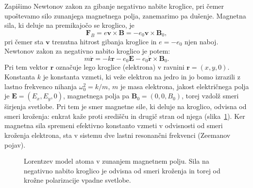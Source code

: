Zapišimo Newtonov zakon za gibanje negativno nabite kroglice,
pri čemer upoštevamo silo zunanjega magnetnega polja, zanemarimo pa dušenje. 
Magnetna sila, ki deluje na premikajočo se kroglico, je 
\begin{equation}
\mathbf{F}_B = e \mathbf{v}\times \mathbf{B} = -e_0 \mathbf{v}\times \mathbf{B}_0,
\label{eq:09_52}
\end{equation}
pri čemer sta $\mathbf{v}$ trenutna hitrost gibanja kroglice in $e = -e_0$
njen naboj. Newtonov zakon za negativno nabito kroglico je potem:
\begin{equation}
m\ddot{\mathbf{r}} = -k \mathbf{r}-e_0 \mathbf{E} -e_0 \dot{\mathbf{r}}\times \mathbf{B}_0.
\label{eq:09_55}
\end{equation}
Pri tem vektor $\mathbf{r}$ označuje lego kroglice (elektrona) v ravnini $\mathbf{r} = (x,y,0)$. Konstanta
$k$ je konstanta vzmeti, ki veže elektron na jedro in  jo bomo izrazili z lastno frekvenco 
nihanja $\omega_0^2 = k/m$, $m$ je masa elektrona, jakost električnega polja je $\mathbf{E} = (E_x, E_y, 0)$,
magnetnega polja pa $\mathbf{B}_0 = (0,0,B_0)$, torej vzdolž smeri širjenja svetlobe. 
Pri tem je smer magnetne sile, ki deluje na kroglico, odvisna od smeri kroženja: 
enkrat kaže proti središču in drugič stran od njega (slika~\ref{fig:09_LorentzB}).
Ker magnetna sila spremeni
efektivno konstanto vzmeti v odvisnosti od smeri kroženja elektrona, sta v sistemu
dve lastni resonančni frekvenci (Zeemanov pojav).
\begin{figure}[ht]
\centering
\def\svgwidth{110truemm} 

\caption{Lorentzev model atoma v zunanjem magnetnem polju. Sila na negativno 
nabito kroglico je odvisna od smeri kroženja in torej od krožne polarizacije vpadne svetlobe.
}
\label{fig:09_LorentzB}
\end{figure}


